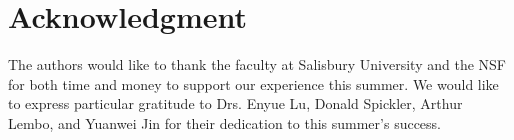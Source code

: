\documentclass[journal]{IEEEtran}
\begin{document}


\section*{Acknowledgment}


The authors would like to thank the faculty at Salisbury University and the NSF
for both time and money to support our experience this summer.  We would like
to express particular gratitude to Drs. Enyue Lu, Donald Spickler, Arthur
Lembo, and Yuanwei Jin for their dedication to this summer's success.


\ifCLASSOPTIONcaptionsoff
  \newpage
\fi




\end{document}

